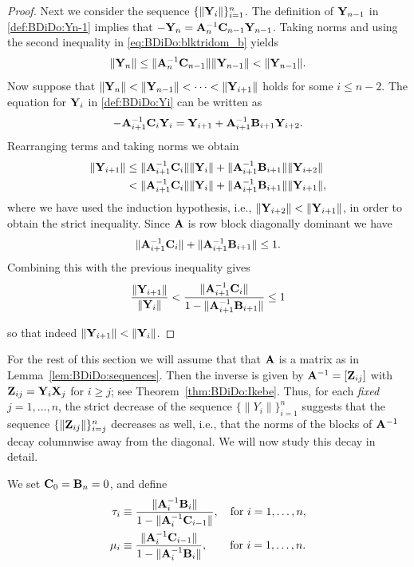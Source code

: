 \begin{proof}
Next we consider the sequence $\{\|\mathbf{Y}_i\|\}_{i=1}^n$. The definition of
$\mathbf{Y}_{n-1}$ in \eqref{def:BDiDo:Yn-1} implies that $-\mathbf{Y}_{n}=\mathbf{A}^{-1}_{n}\mathbf{C}_{n-1}\mathbf{Y}_{n-1}$.
Taking norms and using the second inequality in \eqref{eq:BDiDo:blktridom_b} yields
%
\[
\|\mathbf{Y}_{n}\|\leq\|\mathbf{A}_n^{-1}\mathbf{C}_{n-1}\|\|\mathbf{Y}_{n-1}\| < \|\mathbf{Y}_{n-1}\|.
\]
%
Now suppose that $\|\mathbf{Y}_n\|<\|\mathbf{Y}_{n-1}\|<\cdots<\|\mathbf{Y}_{i+1}\|$ holds for some
$i\leq n-2$. The equation for $\mathbf{Y}_i$ in \eqref{def:BDiDo:Yi} can be written as
%
\[
-\mathbf{A}_{i+1}^{-1}\mathbf{C}_i\mathbf{Y}_{i}=\mathbf{Y}_{i+1}+\mathbf{A}_{i+1}^{-1}\mathbf{B}_{i+1}\mathbf{Y}_{i+2}.
\]
%
Rearranging terms and taking norms we obtain
%
\begin{align*}
\|\mathbf{Y}_{i+1}\| &\leq \|\mathbf{A}_{i+1}^{-1}\mathbf{C}_{i}\|\|\mathbf{Y}_{i}\|+\|\mathbf{A}_{i+1}^{-1}\mathbf{B}_{i+1}\|\|\mathbf{Y}_{i+2}\| \\
&< \|\mathbf{A}_{i+1}^{-1}\mathbf{C}_{i}\|\|\mathbf{Y}_{i}\|+\|\mathbf{A}_{i+1}^{-1}\mathbf{B}_{i+1}\|\|\mathbf{Y}_{i+1}\|,
\end{align*}
%
where we have used the induction hypothesis, i.e., $\|\mathbf{Y}_{i+2}\|<\|\mathbf{Y}_{i+1}\|$,
in order to obtain the strict inequality. Since $\mathbf{A}$ is row block diagonally
dominant we have
%
\[
\|\mathbf{A}_{i+1}^{-1}\mathbf{C}_{i}\|+\|\mathbf{A}_{i+1}^{-1}\mathbf{B}_{i+1}\|\leq 1.
\]
%
Combining this with the previous inequality gives
%
\begin{equation*}
\frac{\|\mathbf{Y}_{i+1}\|}{\|\mathbf{Y}_{i}\|}<\frac{\|\mathbf{A}_{i+1}^{-1}\mathbf{C}_{i}\|}{1-\|\mathbf{A}_{i+1}^{-1}\mathbf{B}_{i+1}\|}\leq 1
\end{equation*}

%
so that indeed $\|\mathbf{Y}_{i+1}\| <\|\mathbf{Y}_i\|$.
%
\end{proof}

For the rest of this section we will assume that that $\mathbf{A}$ is a matrix as in
Lemma~\ref{lem:BDiDo:sequences}. Then the inverse is given by
$\mathbf{A}^{-1}=[\mathbf{Z}_{ij}]$ with $\mathbf{Z}_{ij}=\mathbf{Y}_i\mathbf{X}_j$ for $i\geq j$; see
Theorem~\ref{thm:BDiDo:Ikebe}.
Thus, for each \emph{fixed} $j=1,\dots, n$, the strict decrease of the sequence
$\{\|Y_i\|\}_{i=1}^n$ suggests that the sequence $\{\|\mathbf{Z}_{ij}\|\}_{i=j}^n$
decreases as well, i.e., that the norms of the blocks of $\mathbf{A}^{-1}$ decay
columnwise away from the diagonal. We will now study this decay in detail.

\medskip
We set $\mathbf{C}_0=\mathbf{B}_n=0$, and define
%
\begin{align}
\tau_i   &\equiv \frac{\|\mathbf{A}_i^{-1}\mathbf{B}_i\|}{1-\|\mathbf{A}_i^{-1}\mathbf{C}_{i-1}\|},\quad \text{for $i=1,\ldots,n$},\label{eq:BDiDo:tau} \\
\mu_i &\equiv \frac{\|\mathbf{A}_i^{-1}\mathbf{C}_{i-1}\|}{1-\|\mathbf{A}_i^{-1}\mathbf{B}_{i}\|},\qquad \text{for $i=1,\ldots,n$}.\label{eq:BDiDo:mu}
\end{align}
%

